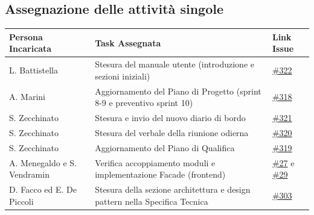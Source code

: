 \documentclass[a4paper, 10pt, colorlinks=true, linkcolor=black, urlcolor=blue, citecolor=blue, hidelinks]{article}
\newcommand{\issue}[1]{\href{https://github.com/thebitless-group-swe/thebitless.github.io/issues/#1}{\##1}}
\newcommand{\issueMVP}[1]{\href{https://github.com/thebitless-group-swe/MVP/issues/#1}{\##1}}
\begin{document}
\subsection{Assegnazione delle attività singole}
\begin{center}
    \renewcommand{\arraystretch}{1.4}
        \begin{tabular}{|p{4.2cm}|p{6.2cm}|p{2.2cm}|}
        \hline
        \textbf{Persona Incaricata} & \textbf{Task Assegnata} & \centering\textbf{Link Issue} \tabularnewline
        \hline
        L. Battistella & Stesura del manuale utente (introduzione e sezioni iniziali) & \issue{322} \\
        \hline
        A. Marini & Aggiornamento del Piano di Progetto (sprint 8-9 e preventivo sprint 10) & \issue{318} \\
        \hline
        S. Zecchinato & Stesura e invio del nuovo diario di bordo & \issue{321} \\
        \hline
        S. Zecchinato & Stesura del verbale della riunione odierna & \issue{320} \\
        \hline
        S. Zecchinato & Aggiornamento del Piano di Qualifica & \issue{319} \\
        \hline
        A. Menegaldo e S. Vendramin & Verifica accoppiamento moduli e implementazione Facade (frontend) & \issueMVP{27} e \issueMVP{29} \\
        \hline
        D. Facco ed E. De Piccoli & Stesura della sezione architettura e design pattern nella Specifica Tecnica & \issue{303} \\
        \hline
    \end{tabular}
\end{center}

\appendix
\end{document}
